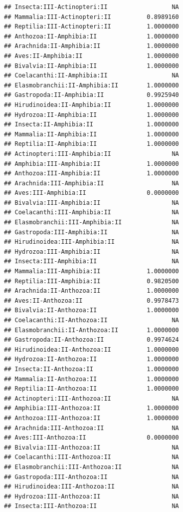 \documentclass[
  12pt,
]{article}
\begin{document}
\begin{verbatim}
## Insecta:III-Actinopteri:II                  NA
## Mammalia:III-Actinopteri:II          0.8989160
## Reptilia:III-Actinopteri:II          1.0000000
## Anthozoa:II-Amphibia:II              1.0000000
## Arachnida:II-Amphibia:II             1.0000000
## Aves:II-Amphibia:II                  1.0000000
## Bivalvia:II-Amphibia:II              1.0000000
## Coelacanthi:II-Amphibia:II                  NA
## Elasmobranchii:II-Amphibia:II        1.0000000
## Gastropoda:II-Amphibia:II            0.9925940
## Hirudinoidea:II-Amphibia:II          1.0000000
## Hydrozoa:II-Amphibia:II              1.0000000
## Insecta:II-Amphibia:II               1.0000000
## Mammalia:II-Amphibia:II              1.0000000
## Reptilia:II-Amphibia:II              1.0000000
## Actinopteri:III-Amphibia:II                 NA
## Amphibia:III-Amphibia:II             1.0000000
## Anthozoa:III-Amphibia:II             1.0000000
## Arachnida:III-Amphibia:II                   NA
## Aves:III-Amphibia:II                 0.0000000
## Bivalvia:III-Amphibia:II                    NA
## Coelacanthi:III-Amphibia:II                 NA
## Elasmobranchii:III-Amphibia:II              NA
## Gastropoda:III-Amphibia:II                  NA
## Hirudinoidea:III-Amphibia:II                NA
## Hydrozoa:III-Amphibia:II                    NA
## Insecta:III-Amphibia:II                     NA
## Mammalia:III-Amphibia:II             1.0000000
## Reptilia:III-Amphibia:II             0.9820500
## Arachnida:II-Anthozoa:II             1.0000000
## Aves:II-Anthozoa:II                  0.9978473
## Bivalvia:II-Anthozoa:II              1.0000000
## Coelacanthi:II-Anthozoa:II                  NA
## Elasmobranchii:II-Anthozoa:II        1.0000000
## Gastropoda:II-Anthozoa:II            0.9974624
## Hirudinoidea:II-Anthozoa:II          1.0000000
## Hydrozoa:II-Anthozoa:II              1.0000000
## Insecta:II-Anthozoa:II               1.0000000
## Mammalia:II-Anthozoa:II              1.0000000
## Reptilia:II-Anthozoa:II              1.0000000
## Actinopteri:III-Anthozoa:II                 NA
## Amphibia:III-Anthozoa:II             1.0000000
## Anthozoa:III-Anthozoa:II             1.0000000
## Arachnida:III-Anthozoa:II                   NA
## Aves:III-Anthozoa:II                 0.0000000
## Bivalvia:III-Anthozoa:II                    NA
## Coelacanthi:III-Anthozoa:II                 NA
## Elasmobranchii:III-Anthozoa:II              NA
## Gastropoda:III-Anthozoa:II                  NA
## Hirudinoidea:III-Anthozoa:II                NA
## Hydrozoa:III-Anthozoa:II                    NA
## Insecta:III-Anthozoa:II                     NA

\end{verbatim}
\end{document}
